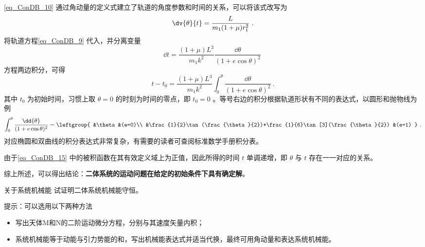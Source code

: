 \autoref{eq_ConDB_10} 通过角动量的定义式建立了轨道的角度参数和时间的关系，可以将该式改写为
\begin{equation}
\dv{\theta}{t}=\frac{L}{ m_1(1+\mu)r_1^2}~.
\end{equation}
将轨道方程\autoref{eq_ConDB_9} 代入，并分离变量
\begin{equation}
\dd{t}=\frac{(1+\mu)L^3}{ m_1k^2}\frac{\dd{\theta}}{(1+e\cos\theta)^2}~
\end{equation}
方程两边积分，可得
\begin{equation}\label{eq_ConDB_15}
t-t_0 = \frac{(1+\mu)L^3}{ m_1k^2}\int_0^{\theta} \frac{\dd{\theta}}{(1+e\cos\theta)^2}~.
\end{equation}
其中 $t_0$ 为初始时间，习惯上取 $\theta=0$ 的时刻为时间的零点，即 $t_0=0$ 。等号右边的积分根据轨道形状有不同的表达式，以圆形和抛物线为例
\begin{equation}
\int_0^{\theta} \frac{\dd{\theta}}{(1+e\cos\theta)^2} =
\leftgroup{
&\theta &(e=0)\\
&\frac{1}{2}\tan(\frac{\theta}{2})+\frac{1}{6}\tan[3](\frac{\theta}{2}) &(e=1)
} ~.
\end{equation}
对应椭圆和双曲线的积分表达式非常复杂，有需要的读者可查阅标准数学手册积分表。

由于\autoref{eq_ConDB_15} 中的被积函数在其有效定义域上为正值，因此所得的时间 $t$ 单调递增，即 $\theta$ 与 $t$ 存在一一对应的关系。

综上所述，可以得出结论：\textbf{二体系统的运动问题在给定的初始条件下具有确定解}。

\begin{exercise}{关于系统机械能}\label{exe_ConDB_1}
试证明二体系统机械能守恒。

提示：可以选用以下两种方法
\begin{itemize}
\item 写出天体M和N的二阶运动微分方程，分别与其速度矢量内积；
\item 系统机械能等于动能与引力势能的和，写出机械能表达式并适当代换，最终可用角动量和表达系统机械能。
\end{itemize}
\end{exercise}
